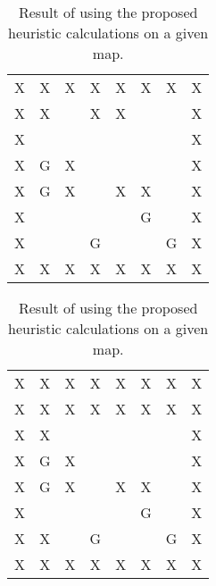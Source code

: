 \begin{table}[H]
\begin{subtable}{.5\linewidth}
\centering
\begin{tabular}{| *{8}{c} |}
\hline
X & X & X & X & X & X & X & X \\
X & X &   & X & X &   &   & X \\
X &   &   &   &   &   &   & X \\
X & G & X &   &   &   &   & X \\
X & G & X &   & X & X &   & X \\
X &   &   &   &   & G &   & X \\
X &   &   & G &   &   & G & X \\
X & X & X & X & X & X & X & X \\
\hline
\end{tabular}
\caption{Original test map.}
\label{fig:orig_testmap_deadlock}
\end{subtable}
%
\begin{subtable}{.5\linewidth}
\centering
\begin{tabular}{| *{8}{c} |}
\hline
X & X & X & X & X & X & X & X \\
X & X & X & X & X & X & X & X \\
X & X &   &   &   &   &   & X \\
X & G & X &   &   &   &   & X \\
X & G & X &   & X & X &   & X \\
X &   &   &   &   & G &   & X \\
X & X &   & G &   &   & G & X \\
X & X & X & X & X & X & X & X \\
\hline
\end{tabular}
\caption{Deadlock test map.}
\label{fig:orig_deadlock}
\end{subtable}
\caption{Result of using the proposed heuristic calculations on a given map.}
\label{fig:deadlocks}
\end{table}

